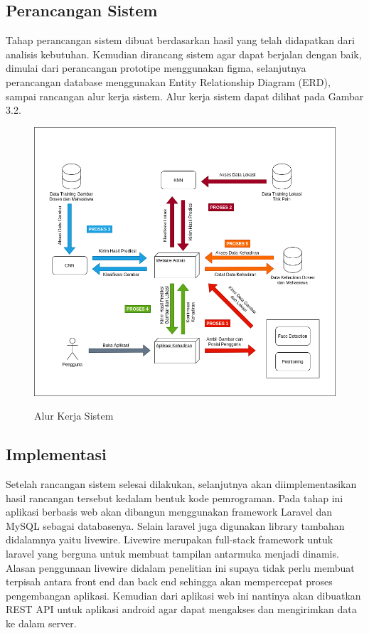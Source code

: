 
\subsection{Perancangan Sistem}
Tahap perancangan sistem dibuat berdasarkan hasil yang telah didapatkan dari analisis kebutuhan. Kemudian dirancang sistem agar dapat berjalan dengan baik, dimulai dari perancangan prototipe menggunakan figma, selanjutnya perancangan database menggunakan Entity Relationship Diagram (ERD), sampai rancangan alur kerja sistem. Alur kerja sistem dapat dilihat pada Gambar 3.2.

\begin{figure}[H]
\centering
{\includegraphics [width = 14cm, height= 10cm]{gambar/alur_kerja_diagram_new}}
\caption{Alur Kerja Sistem}
\label{alur_kerja_sistem}
\end{figure}

\subsection{Implementasi}
Setelah rancangan sistem selesai dilakukan, selanjutnya akan diimplementasikan hasil rancangan tersebut kedalam bentuk kode pemrograman. Pada tahap ini aplikasi berbasis web akan dibangun menggunakan framework Laravel dan MySQL sebagai databasenya. Selain laravel juga digunakan library tambahan didalamnya yaitu livewire. Livewire merupakan full-stack framework untuk laravel yang berguna untuk membuat tampilan antarmuka menjadi dinamis. Alasan penggunaan livewire didalam penelitian ini supaya tidak perlu membuat terpisah antara front end dan back end sehingga akan mempercepat proses pengembangan aplikasi. Kemudian dari aplikasi web ini nantinya akan dibuatkan REST API untuk aplikasi android agar dapat mengakses dan mengirimkan data ke dalam server.

